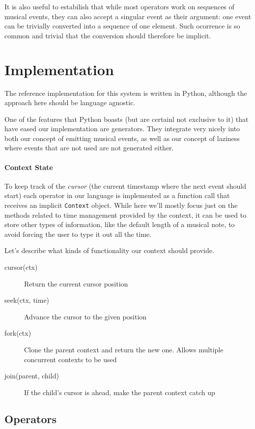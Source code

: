 \documentclass[a4paper,UKenglish,cleveref, autoref]{oasics-v2019}
\begin{document}
It is also useful to estabilish that while most operators work on sequences of musical events, they can also accept a singular event as their argument: one event can be trivially converted into a sequence of one element. Such ocorrence is so common and trivial that the conversion should therefore be implicit.

\section{Implementation}
The reference implementation for this system is written in Python, although the approach here should be language agnostic.

One of the features that Python boasts (but are certainl not exclusive to it) that have eased our implementation are generators\cite{PEP255}. They integrate very nicely into both our concept of emitting musical events, as well as our concept of laziness where events that are not used are not generated either.

\paragraph*{Context State}
To keep track of the \textit{cursor} (the current timestamp where the next event should start) each operator in our language is implemented as a function call that receives an implicit \texttt{Context} object. While here we'll mostly focus just on the methods related to time management provided by the context, it can be used to store other types of information, like the default length of a musical note, to avoid forcing the user to type it out all the time.

Let's describe what kinds of functionality our context should provide.

\begin{description}
    \item[cursor(ctx)] Return the current cursor position
    \item[seek(ctx, time)] Advance the cursor to the given position
    \item[fork(ctx)] Clone the parent context and return the new one. Allows multiple concurrent contexts to be used
    \item[join(parent, child)] If the child's cursor is ahead, make the parent context catch up
\end{description}

\subsection{Operators}
\end{document}
